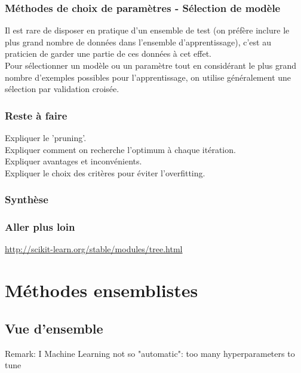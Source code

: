 \documentclass[a4paper]{article}
\theoremstyle{plain}
\begin{document}
\subsubsection{Méthodes de choix de paramètres - Sélection de modèle}

Il est rare de disposer en pratique d’un ensemble de test (on préfère inclure le plus grand nombre de
données dans l’ensemble d’apprentissage), c’est au praticien de garder une partie de ces données à cet
effet. \\

Pour sélectionner un modèle ou un paramètre tout en considérant le plus grand nombre d’exemples
possibles pour l’apprentissage, on utilise généralement une sélection par validation croisée. 

\subsubsection{Reste à faire}

Expliquer le 'pruning'.\\

Expliquer comment on recherche l'optimum à chaque itération.\\

Expliquer avantages et inconvénients.\\

Expliquer le choix des critères pour éviter l'overfitting.

\subsubsection{Synthèse}

\subsubsection{Aller plus loin}

\url{http://scikit-learn.org/stable/modules/tree.html}






\pagebreak
\section{Méthodes ensemblistes}
\subsection{Vue d'ensemble}
Remark:
I Machine Learning not so "automatic": too many
hyperparameters to tune
\end{document}
